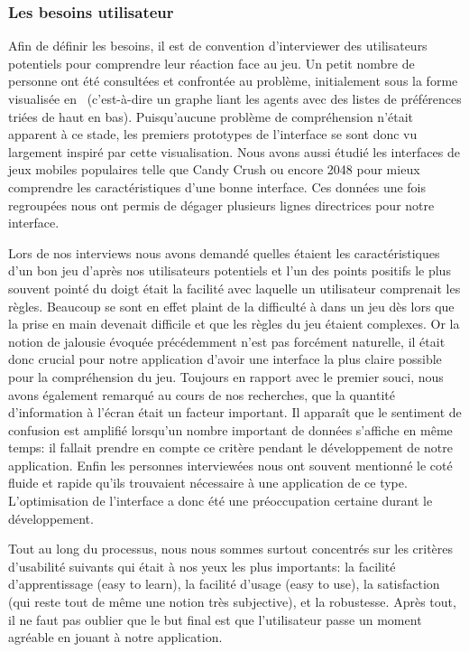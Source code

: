 \documentclass[../main.tex]{subfiles}
\begin{document}
	\subsubsection{Les besoins utilisateur}

Afin de définir les besoins, il est de convention d'interviewer des utilisateurs potentiels pour comprendre leur réaction face au jeu. Un petit nombre de personne ont été consultées et confrontée au problème, initialement sous la forme visualisée en~ (c'est-à-dire un graphe liant les agents avec des listes de préférences triées de haut en bas). Puisqu'aucune problème de compréhension n'était apparent à ce stade, les premiers prototypes de l'interface se sont donc vu largement inspiré par cette visualisation. Nous avons aussi étudié les interfaces de jeux mobiles populaires telle que Candy Crush ou encore 2048 pour mieux comprendre les caractéristiques d'une bonne interface. Ces données une fois regroupées nous ont permis de dégager plusieurs lignes directrices pour notre interface.

Lors de nos interviews nous avons demandé quelles étaient les caractéristiques d'un bon jeu d'après nos utilisateurs potentiels et l'un des points positifs le plus souvent pointé du doigt était la facilité avec laquelle un utilisateur comprenait les règles. Beaucoup se sont en effet plaint de la difficulté à  dans un jeu dès lors que la prise en main devenait difficile et que les règles du jeu étaient complexes. Or la notion de jalousie évoquée précédemment n'est pas forcément naturelle, il était donc crucial pour notre application d'avoir une interface la plus claire possible pour la compréhension du jeu. Toujours en rapport avec le premier souci, nous avons également remarqué au cours de nos recherches, que la quantité d'information à l'écran était un facteur important. Il apparaît que le sentiment de confusion est amplifié lorsqu'un nombre important de données s'affiche en même temps: il fallait prendre en compte ce critère pendant le développement de notre application. Enfin les personnes interviewées nous ont souvent mentionné le coté fluide et rapide qu'ils trouvaient nécessaire à une application de ce type. L'optimisation de l'interface a donc été une préoccupation certaine durant le développement.

Tout au long du processus, nous nous sommes surtout concentrés sur les critères d'usabilité suivants qui était à nos yeux les plus importants: la facilité d'apprentissage (easy to learn), la facilité d'usage (easy to use), la satisfaction (qui reste tout de même une notion très subjective), et la robustesse. Après tout, il ne faut pas oublier que le but final est que l'utilisateur passe un moment agréable en jouant à notre application.
\end{document}
